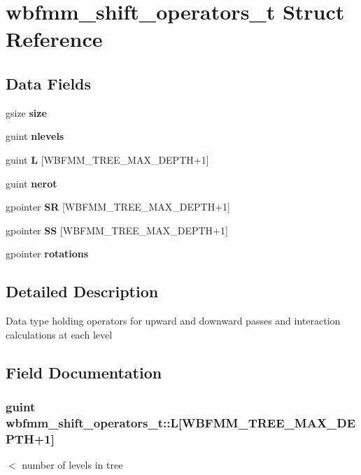 \section{wbfmm\+\_\+shift\+\_\+operators\+\_\+t Struct Reference}
\label{structwbfmm__shift__operators__t}
\subsection*{Data Fields}
\begin{DoxyCompactItemize}
\item 
gsize {\bf size}
\item 
guint {\bf nlevels}
\item 
guint {\bf L} [W\+B\+F\+M\+M\+\_\+\+T\+R\+E\+E\+\_\+\+M\+A\+X\+\_\+\+D\+E\+P\+T\+H+1]
\item 
guint {\bf nerot}
\item 
gpointer {\bf S\+R} [W\+B\+F\+M\+M\+\_\+\+T\+R\+E\+E\+\_\+\+M\+A\+X\+\_\+\+D\+E\+P\+T\+H+1]
\item 
gpointer {\bf S\+S} [W\+B\+F\+M\+M\+\_\+\+T\+R\+E\+E\+\_\+\+M\+A\+X\+\_\+\+D\+E\+P\+T\+H+1]
\item 
gpointer {\bf rotations}
\end{DoxyCompactItemize}


\subsection{Detailed Description}
Data type holding operators for upward and downward passes and interaction calculations at each level 

\subsection{Field Documentation}
\subsubsection[{L}]{\setlength{\rightskip}{0pt plus 5cm}guint wbfmm\+\_\+shift\+\_\+operators\+\_\+t\+::\+L[W\+B\+F\+M\+M\+\_\+\+T\+R\+E\+E\+\_\+\+M\+A\+X\+\_\+\+D\+E\+P\+T\+H+1]}\label{structwbfmm__shift__operators__t_a4cae6342c4c5a47c1c392f24e0650aaa}
$<$ number of levels in tree 
